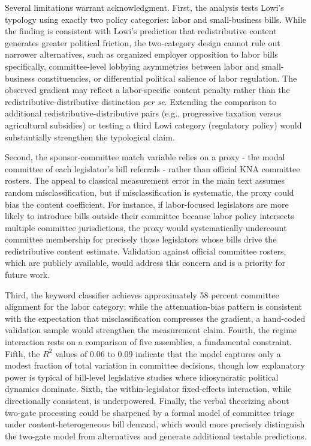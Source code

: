 \documentclass[11pt]{article}
\begin{document}
Several limitations warrant acknowledgment. First, the analysis tests Lowi's typology using exactly two policy categories: labor and small-business bills. While the finding is consistent with Lowi's prediction that redistributive content generates greater political friction, the two-category design cannot rule out narrower alternatives, such as organized employer opposition to labor bills specifically, committee-level lobbying asymmetries between labor and small-business constituencies, or differential political salience of labor regulation. The observed gradient may reflect a labor-specific content penalty rather than the redistributive-distributive distinction \textit{per se}. Extending the comparison to additional redistributive-distributive pairs (e.g., progressive taxation versus agricultural subsidies) or testing a third Lowi category (regulatory policy) would substantially strengthen the typological claim.

Second, the sponsor-committee match variable relies on a proxy - the modal committee of each legislator's bill referrals - rather than official KNA committee rosters. The appeal to classical measurement error in the main text assumes random misclassification, but if misclassification is systematic, the proxy could bias the content coefficient. For instance, if labor-focused legislators are more likely to introduce bills outside their committee because labor policy intersects multiple committee jurisdictions, the proxy would systematically undercount committee membership for precisely those legislators whose bills drive the redistributive content estimate. Validation against official committee rosters, which are publicly available, would address this concern and is a priority for future work.

Third, the keyword classifier achieves approximately 58 percent committee alignment for the labor category; while the attenuation-bias pattern is consistent with the expectation that misclassification compresses the gradient, a hand-coded validation sample would strengthen the measurement claim. Fourth, the regime interaction rests on a comparison of five assemblies, a fundamental constraint. Fifth, the $R^2$ values of 0.06 to 0.09 indicate that the model captures only a modest fraction of total variation in committee decisions, though low explanatory power is typical of bill-level legislative studies where idiosyncratic political dynamics dominate. Sixth, the within-legislator fixed-effects interaction, while directionally consistent, is underpowered. Finally, the verbal theorizing about two-gate processing could be sharpened by a formal model of committee triage under content-heterogeneous bill demand, which would more precisely distinguish the two-gate model from alternatives and generate additional testable predictions.
\end{document}
